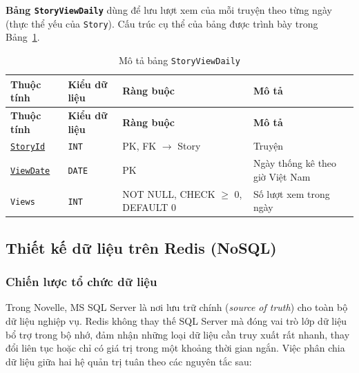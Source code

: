 \textbf{Bảng \texttt{StoryViewDaily}} dùng để lưu lượt xem của mỗi truyện theo từng ngày (thực thể yếu của \texttt{Story}). Cấu trúc cụ thể của bảng được trình bày trong Bảng~\ref{tab:db-story-view-daily}.


{\small
\renewcommand{\arraystretch}{1.2}
\begin{longtable}{|>{\raggedright\arraybackslash}p{3.1cm}|>{\raggedright\arraybackslash}p{2.7cm}|>{\raggedright\arraybackslash}p{4.0cm}|>{\raggedright\arraybackslash}p{5.4cm}|}
\caption{Mô tả bảng \texttt{StoryViewDaily}}\label{tab:db-story-view-daily}\\
\hline
\textbf{Thuộc tính} & \textbf{Kiểu dữ liệu} & \textbf{Ràng buộc} & \textbf{Mô tả} \\ \hline
\endfirsthead
\hline
\textbf{Thuộc tính} & \textbf{Kiểu dữ liệu} & \textbf{Ràng buộc} & \textbf{Mô tả} \\ \hline
\endhead
\underline{\texttt{StoryId}} & \texttt{INT} & PK, FK $\rightarrow$ Story & Truyện \\ \hline
\underline{\texttt{ViewDate}} & \texttt{DATE} & PK & Ngày thống kê theo giờ Việt Nam \\ \hline
\texttt{Views} & \texttt{INT} & NOT NULL, CHECK $\geq$ 0, DEFAULT 0 & Số lượt xem trong ngày \\ \hline
\end{longtable}
}

\subsection{Thiết kế dữ liệu trên Redis (NoSQL)}
\label{subsec:redis-design}

\subsubsection{Chiến lược tổ chức dữ liệu}
\label{subsubsec:redis-strategy}

Trong Novelle, MS SQL Server là nơi lưu trữ chính (\emph{source of truth}) cho toàn bộ dữ liệu nghiệp vụ. Redis không thay thế SQL Server mà đóng vai trò lớp dữ liệu bổ trợ trong bộ nhớ, đảm nhận những loại dữ liệu cần truy xuất rất nhanh, thay đổi liên tục hoặc chỉ có giá trị trong một khoảng thời gian ngắn. Việc phân chia dữ liệu giữa hai hệ quản trị tuân theo các nguyên tắc sau:

